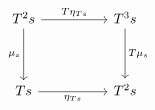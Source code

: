 \[\begin{tikzcd}
	{T^{2}s} && {T^{3}s} \\
	\\
	Ts && {T^{2}s}
	\arrow["{\mu_{s}}"', from=1-1, to=3-1]
	\arrow["{T\mu_{s}}", from=1-3, to=3-3]
	\arrow["{\eta_{Ts}}"', from=3-1, to=3-3]
	\arrow["{T\eta_{Ts}}", from=1-1, to=1-3]
\end{tikzcd}\]